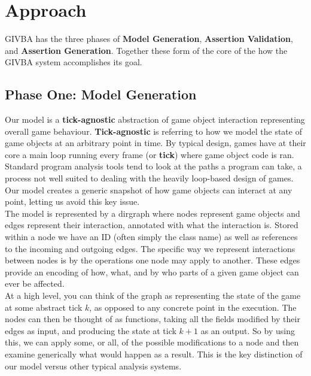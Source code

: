 \documentclass[letterpaper,twocolumn,10pt]{article}
\begin{document}
\section{Approach}

GIVBA has the three phases of \textbf{Model Generation}, \textbf{Assertion Validation}, and \textbf{Assertion Generation}. Together these form of the core of the how the GIVBA system accomplishes its goal. 

\subsection{Phase One: Model Generation}

Our model is a \textbf{tick-agnostic} abstraction of game object interaction representing overall game behaviour. \textbf{Tick-agnostic} is referring to how we model the state of game objects at an arbitrary point in time. By typical design, games have at their core a main loop running every frame (or \textbf{tick}) where game object code is ran. Standard program analysis tools tend to look at the paths a program can take, a process not well suited to dealing with the heavily loop-based design of games. Our model creates a generic snapshot of how game objects can interact at any point, letting us avoid this key issue. \\

The model is represented by a dirgraph where nodes represent game objects and edges represent their interaction, annotated with what the interaction is. Stored within a node we have an ID (often simply the class name) as well as references to the incoming and outgoing edges. The specific way we represent interactions between nodes is by the operations one node may apply to another. These edges provide an encoding of how, what, and by who parts of a given game object can ever be affected. \\

At a high level, you can think of the graph as representing the state of the game at some abstract tick $k$, as opposed to any concrete point in the execution. The nodes can then be thought of as functions, taking all the fields modified by their edges as input, and producing the state at tick $k + 1$ as an output. So by using this, we can apply some, or all, of the possible modifications to a node and then examine generically what would happen as a result. This is the key distinction of our model versus other typical analysis systems. \\
\end{document}
